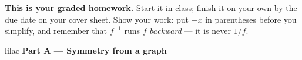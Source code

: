 \documentclass[10pt]{article}
\begin{document}

\vspace{0.12in}

\boxguard[8]
\begin{remindbox}
\small
\textbf{This is your graded homework.} Start it in class; finish it on your own by the due
date on your cover sheet. Show your work: put $-x$ in parentheses before you simplify, and
remember that $f^{-1}$ runs $f$ \emph{backward} --- it is never $1/f$.
\end{remindbox}

\vspace{0.12in}

\begin{headlinebox}{lilac}
\textbf{\color{plum}Part A --- Symmetry from a graph}
\end{headlinebox}
\end{document}
